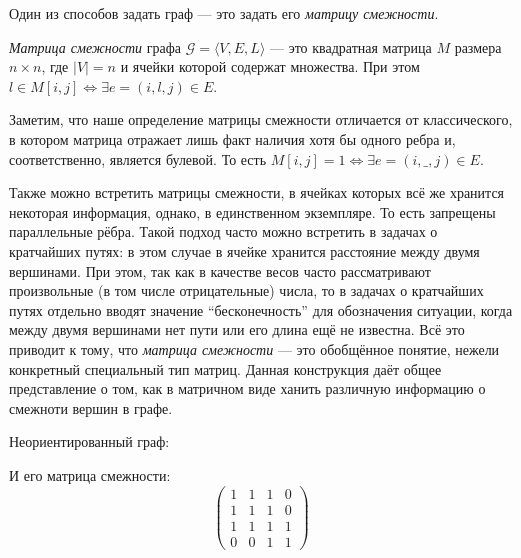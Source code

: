 Один из способов задать граф --- это задать его \textit{матрицу смежности}.

\begin{definition}
  \textit{Матрица смежности} графа $\mathcal{G}=\langle V,E,L \rangle$ --- это квадратная матрица $M$ размера $n \times n$, где $|V| = n$ и ячейки которой содержат множества.
  При этом $l \in M[i,j] \iff \exists e = (i,l,j) \in E$.
\end{definition}

Заметим, что наше определение матрицы смежности отличается от классического, в котором матрица отражает лишь факт наличия хотя бы одного ребра и, соответственно, является булевой. То есть $M[i,j] = 1 \iff \exists e = (i,\_,j) \in E$.


Также можно встретить матрицы смежности, в ячейках которых всё же хранится некоторая информация, однако, в единственном экземпляре. То есть запрещены параллельные рёбра.
Такой подход часто можно встретить в задачах о кратчайших путях: в этом случае в ячейке хранится расстояние между двумя вершинами.
При этом, так как в качестве весов часто рассматривают произвольные (в том числе отрицательные) числа, то в задачах о кратчайших путях отдельно вводят значение ``бесконечность'' для обозначения ситуации, когда между двумя вершинами нет пути или его длина ещё не известна. 
Всё это приводит к тому, что \textit{матрица смежности} --- это обобщённое понятие, нежели конкретный специальный тип матриц.
Данная конструкция даёт общее представление о том, как в матричном виде ханить различную информацию о смежноти вершин в графе.

\begin{example}
  Неориентированный граф:
  \begin{center}
  \end{center}

  И его матрица смежности:
  $$
  \begin{pmatrix}
    1 & 1 & 1 & 0 \\
    1 & 1 & 1 & 0 \\
    1 & 1 & 1 & 1 \\
    0 & 0 & 1 & 1
  \end{pmatrix}
  $$
\end{example}

